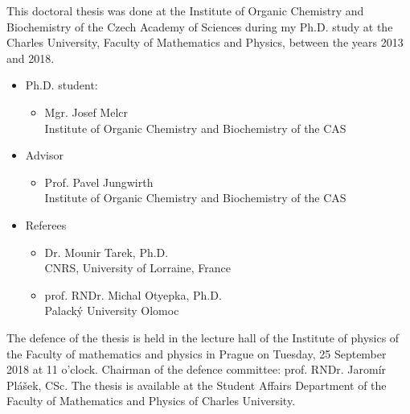 \documentclass[12pt,a4paper,twoside,openright]{report}
\begin{document}
\newlength{\figwidth}
\setlength{\figwidth}{9 cm} 
\newlength{\figwidthsmall}
\setlength{\figwidthsmall}{6 cm} 
\newlength{\figwidthfull}
\setlength{\figwidthfull}{14 cm} 





This doctoral thesis was done at the Institute of Organic Chemistry and
Biochemistry of the Czech Academy of Sciences during my Ph.D. study at
the Charles University, Faculty of Mathematics and Physics, 
between the years 2013 and 2018.

\begin{itemize}
\item Ph.D. student:
	\begin{itemize}
	\item[~] Mgr. Josef Melcr \\
	Institute of Organic Chemistry and Biochemistry of the CAS \\
	\end{itemize}

\item Advisor
	\begin{itemize}
	\item[~] Prof. Pavel Jungwirth \\
	Institute of Organic Chemistry and Biochemistry of the CAS \\
	\end{itemize}

\item Referees
	\begin{itemize}
	\item[~] Dr. Mounir Tarek, Ph.D. \\
	CNRS, University of Lorraine, France \\
	\item[~] prof. RNDr. Michal Otyepka, Ph.D.  \\
	Palack\'{y} University Olomoc \\
	\end{itemize}
\end{itemize}

The defence of the thesis is held 
in the lecture hall of the Institute of physics 
of the Faculty of mathematics and physics in Prague
on Tuesday, 25 September 2018 at 11 o'clock. 
Chairman of the defence committee:
prof. RNDr. Jaromír Plášek, CSc.
The thesis is available at the Student Affairs Department of the Faculty of
Mathematics and Physics of Charles University. 
\end{document}
